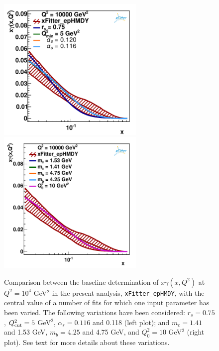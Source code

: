 \begin{figure}[t]
\centering
\includegraphics[width=7cm]{figs/q2_10000_pdf_ph_model_1}
\includegraphics[width=7cm]{figs/q2_10000_pdf_ph_model_2}
\caption{Comparison between the baseline determination of
  $x\gamma(x,Q^2)$ at $Q^2=10^4$ GeV$^2$ in the present
  analysis, {\tt xFitter\_epHMDY},
  with the central value of a number of fits for which one input parameter has been varied.
  The following variations have been considered: $r_s=0.75$, $Q^2_{\rm cut}=5$ GeV$^2$, $\alpha_s=0.116$ and
  0.118 (left plot); and
  $m_c=1.41$ and 1.53 GeV, $m_b=4.25$ and 4.75 GeV, and $Q_0^2=10$ GeV$^2$ (right plot).
  See text for more details about these variations.
}
\label{fig:model}
\end{figure}

